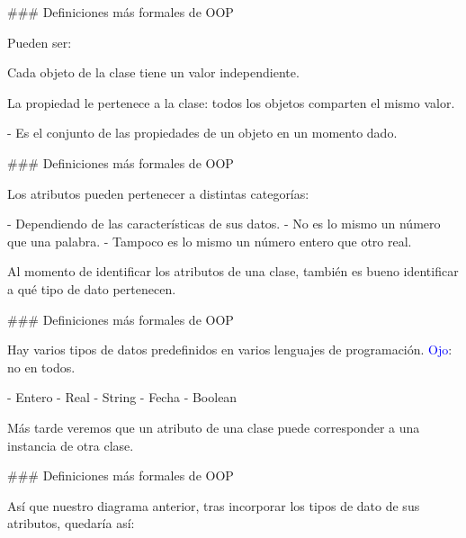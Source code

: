 ### Definiciones más formales de OOP


Pueden ser:

\begin{description}[leftmargin=3em]
    \item[De instancia:] Cada objeto de la clase tiene un valor independiente.
    \item[De clase:] La propiedad le pertenece a la clase: todos los objetos
    comparten el mismo valor.
\end{description}

\vfill
{}

- Es el conjunto de las propiedades de un objeto en un momento dado.

### Definiciones más formales de OOP


Los atributos pueden pertenecer a distintas categorías:

- Dependiendo de las características de sus datos.
- No es lo mismo un número que una palabra.
- Tampoco es lo mismo un número entero que otro real.

\vfill
Al momento de identificar los atributos de una clase, también
es bueno identificar a qué tipo de dato pertenecen.

### Definiciones más formales de OOP


Hay varios tipos de datos predefinidos en varios lenguajes de programación. \textcolor{blue}{Ojo}: no
en todos.

- Entero
- Real
- String
- Fecha
- Boolean

Más tarde veremos que un atributo de una clase puede corresponder a una instancia de otra clase.

### Definiciones más formales de OOP


Así que nuestro diagrama anterior, tras incorporar los tipos de dato de sus atributos, quedaría así:

\vfill
\centering{}

